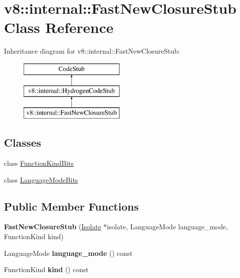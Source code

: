 \hypertarget{classv8_1_1internal_1_1_fast_new_closure_stub}{}\section{v8\+:\+:internal\+:\+:Fast\+New\+Closure\+Stub Class Reference}
\label{classv8_1_1internal_1_1_fast_new_closure_stub}
Inheritance diagram for v8\+:\+:internal\+:\+:Fast\+New\+Closure\+Stub\+:\begin{figure}[H]
\begin{center}
\leavevmode
\includegraphics[height=3.000000cm]{classv8_1_1internal_1_1_fast_new_closure_stub}
\end{center}
\end{figure}
\subsection*{Classes}
\begin{DoxyCompactItemize}
\item 
class \hyperlink{classv8_1_1internal_1_1_fast_new_closure_stub_1_1_function_kind_bits}{Function\+Kind\+Bits}
\item 
class \hyperlink{classv8_1_1internal_1_1_fast_new_closure_stub_1_1_language_mode_bits}{Language\+Mode\+Bits}
\end{DoxyCompactItemize}
\subsection*{Public Member Functions}
\begin{DoxyCompactItemize}
\item 
{\bfseries Fast\+New\+Closure\+Stub} (\hyperlink{classv8_1_1internal_1_1_isolate}{Isolate} $\ast$isolate, Language\+Mode language\+\_\+mode, Function\+Kind kind)\hypertarget{classv8_1_1internal_1_1_fast_new_closure_stub_af7c724897118b0f436fc0924ec1e9e15}{}\label{classv8_1_1internal_1_1_fast_new_closure_stub_af7c724897118b0f436fc0924ec1e9e15}

\item 
Language\+Mode {\bfseries language\+\_\+mode} () const \hypertarget{classv8_1_1internal_1_1_fast_new_closure_stub_a9dfbb7480cd11535046a0b8c69ef7848}{}\label{classv8_1_1internal_1_1_fast_new_closure_stub_a9dfbb7480cd11535046a0b8c69ef7848}

\item 
Function\+Kind {\bfseries kind} () const \hypertarget{classv8_1_1internal_1_1_fast_new_closure_stub_af15030f6ccf5abe892421e4eadbc1861}{}\label{classv8_1_1internal_1_1_fast_new_closure_stub_af15030f6ccf5abe892421e4eadbc1861}

\end{DoxyCompactItemize}
